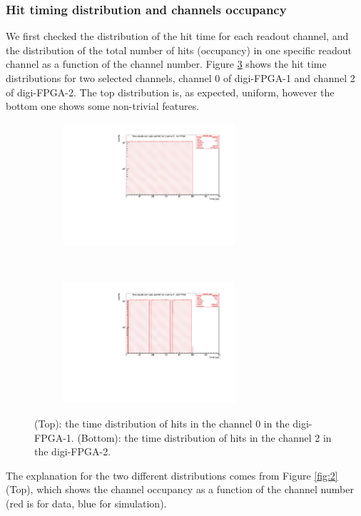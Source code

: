 \subsubsection{Hit timing distribution and channels occupancy}\label{over}
We first checked the distribution of the hit time for 
each readout channel, and the distribution of the 
total number of hits (occupancy) in one specific 
readout channel as a function of the channel number. 
Figure \ref{fig:1} shows the hit time 
distributions for two selected channels, 
channel 0 of digi-FPGA-1 and channel 2 of digi-FPGA-2.
The top distribution is, as expected, uniform, 
however the bottom one shows some non-trivial features.
\begin{figure}[!h]
  \begin{subfigure}[b]{\textwidth}
      \centering
      \includegraphics[width=0.7\textwidth]{figures/pdf/figure_00007_timedistr_roc_simulation_ch0_281.pdf}
      \label{fig:t1}
  \end{subfigure}
\\
  \begin{subfigure}[b]{\textwidth}
      \centering
      \includegraphics[width=0.7\textwidth]{figures/pdf/figure_00003_timedistr_roc_simulation_ch2_281.pdf}
      \label{fig:t2}
  \end{subfigure}
     \caption[The time distribution of hits.]{(Top): the time distribution of hits in the channel 0 in the digi-FPGA-1.
     (Bottom): the time distribution of hits in the channel 2 in the digi-FPGA-2.}
     \label{fig:1}
\end{figure}
The explanation for the two different distributions 
comes from Figure \ref{fig:2} (Top), 
which shows the channel occupancy as a function of the channel number 
(red is for data, blue for simulation).


